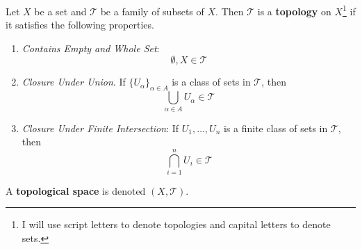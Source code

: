  \begin{definition}[Topology]
    Let $X$ be a set and $\mathscr{T}$ be a family of subsets of $X$. Then $\mathscr{T}$ is a \textbf{topology} on $X$\footnote{I will use script letters to denote topologies and capital letters to denote sets.} if it satisfies the following properties. 
    \begin{enumerate}
      \item \textit{Contains Empty and Whole Set}: 
      \begin{equation}
        \emptyset, X \in \mathscr{T}
      \end{equation}

      \item \textit{Closure Under Union}. If $\{U_\alpha\}_{\alpha \in A}$ is a class of sets in $\mathscr{T}$, then 
      \begin{equation}
        \bigcup_{\alpha \in A} U_\alpha \in \mathscr{T}
      \end{equation}

      \item \textit{Closure Under Finite Intersection}: If $U_1, \ldots, U_n$ is a finite class of sets in $\mathscr{T}$, then 
      \begin{equation}
       \bigcap_{i=1}^{n} U_i \in \mathscr{T}
      \end{equation}
    \end{enumerate}
    A \textbf{topological space} is denoted $(X, \mathscr{T})$. 
  \end{definition}

